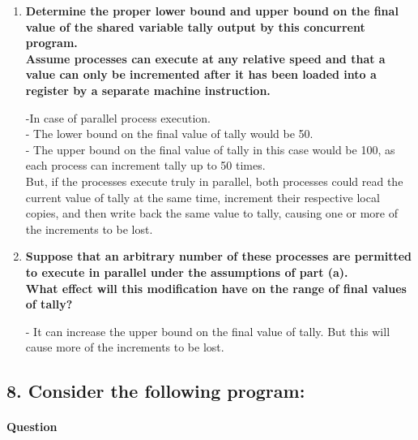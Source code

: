 \documentclass[a4paper,12pt,fleqn]{article}
\newcounter{question}
\newcommand*\question{%
\stepcounter{question}%
\paragraph{Question \thequestion}}
\begin{document}

\begin{enumerate}
	\item \textbf{ Determine the proper lower bound and upper bound on the final value of the shared variable tally output by this concurrent program.\\
 	Assume processes can execute at any relative speed and that a value can only be incremented after it has been loaded into a register by a separate machine instruction.}
 	\begin{answer}
	-In case of parallel process execution.\\
 	- The lower bound on the final value of tally would be 50.\\
 	- The upper bound on the final value of tally in this case would be 100, as each process can increment tally up to 50 times.\\ 
 	But, if the processes execute truly in parallel, both processes could read the current value of tally at the same time, increment their respective local copies, and then write back the same value to tally, causing one or more of the increments to be lost.
 	\end{answer}
 	
	\item \textbf{ Suppose that an arbitrary number of these processes are permitted to execute in parallel under the assumptions of part (a).\\
 	What effect will this modification have on the range of final values of tally?}
	\begin{answer}
	- It can increase the upper bound on the final value of tally. But this will cause more of the increments to be lost.
 	\end{answer}
\end{enumerate}
\subsection*{8. Consider the following program:}
\question


\end{document}
